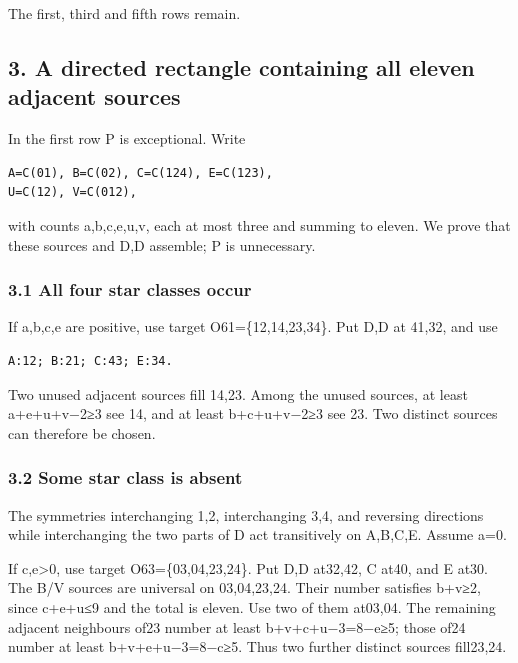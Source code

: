 \documentclass[
  10pt,
]{article}
\begin{document}
The first, third and fifth rows remain.

\hypertarget{a-directed-rectangle-containing-all-eleven-adjacent-sources}{%
\subsection*{3. A directed rectangle containing all eleven adjacent
sources}\label{a-directed-rectangle-containing-all-eleven-adjacent-sources}}

In the first row P is exceptional. Write

\begin{verbatim}
A=C(01), B=C(02), C=C(124), E=C(123),
U=C(12), V=C(012),
\end{verbatim}

with counts a,b,c,e,u,v, each at most three and summing to eleven. We
prove that these sources and D,D assemble; P is unnecessary.

\hypertarget{all-four-star-classes-occur}{%
\subsubsection*{3.1 All four star classes
occur}\label{all-four-star-classes-occur}}

If a,b,c,e are positive, use target O61=\{12,14,23,34\}. Put D,D at
41,32, and use

\begin{verbatim}
A:12; B:21; C:43; E:34.
\end{verbatim}

Two unused adjacent sources fill 14,23. Among the unused sources, at
least a+e+u+v−2≥3 see 14, and at least b+c+u+v−2≥3 see 23. Two distinct
sources can therefore be chosen.

\hypertarget{some-star-class-is-absent}{%
\subsubsection*{3.2 Some star class is
absent}\label{some-star-class-is-absent}}

The symmetries interchanging 1,2, interchanging 3,4, and reversing
directions while interchanging the two parts of D act transitively on
A,B,C,E. Assume a=0.

If c,e\textgreater0, use target O63=\{03,04,23,24\}. Put D,D at32,42, C
at40, and E at30. The B/V sources are universal on 03,04,23,24. Their
number satisfies b+v≥2, since c+e+u≤9 and the total is eleven. Use two
of them at03,04. The remaining adjacent neighbours of23 number at least
b+v+c+u−3=8−e≥5; those of24 number at least b+v+e+u−3=8−c≥5. Thus two
further distinct sources fill23,24.
\end{document}
